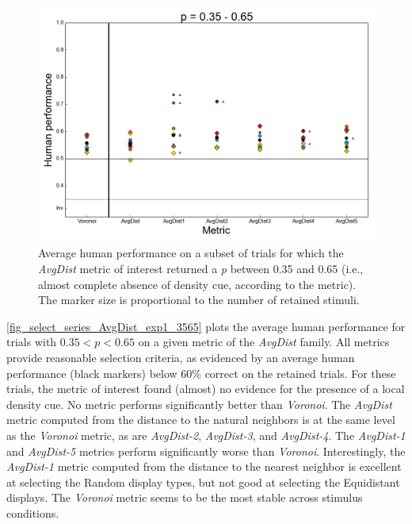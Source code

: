 \documentclass[12pt]{article}
\begin{document}
\begin{figure}
\includegraphics{Figures/FIG_SUP_select_series_AvgDist_exp1_3565.png}
\caption{Average human performance on a subset of trials for which the \emph{AvgDist} metric of interest returned a \emph{p} between 0.35 and 0.65 (i.e., almost complete absence of density cue, according to the metric). The marker size is proportional to the number of retained stimuli.}
\label{fig_select_series_AvgDist_exp1_3565}
\end{figure}


\autoref{fig_select_series_AvgDist_exp1_3565} plots the average human performance for trials with $0.35 < p < 0.65$ on a given metric of the \textit{AvgDist} family. All metrics provide reasonable selection criteria, as evidenced by an average human performance (black markers) below 60\% correct on the retained trials. For these trials, the metric of interest found (almost) no evidence for the presence of a local density cue. No metric performs significantly better than \emph{Voronoi}. The \emph{AvgDist} metric computed from the distance to the natural neighbors is at the same level as the \emph{Voronoi} metric, as are \emph{AvgDist-2}, \emph{AvgDist-3}, and \emph{AvgDist-4}. The \emph{AvgDist-1} and \emph{AvgDist-5} metrics perform significantly worse than \emph{Voronoi}. Interestingly, the \textit{AvgDist-1} metric computed from the distance to the nearest neighbor is excellent at selecting the Random display types, but not good at selecting the Equidistant displays. The \emph{Voronoi} metric seems to be the most stable across stimulus conditions.
\end{document}
